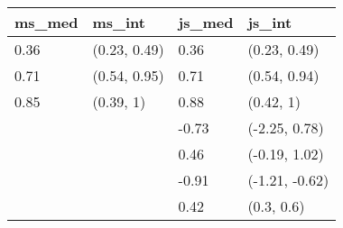 
\begin{tabular}{llll}
\toprule
ms\_med & ms\_int & js\_med & js\_int\\
\midrule
0.36 & (0.23, 0.49) & 0.36 & (0.23, 0.49)\\
0.71 & (0.54, 0.95) & 0.71 & (0.54, 0.94)\\
0.85 & (0.39, 1) & 0.88 & (0.42, 1)\\
 &  & -0.73 & (-2.25, 0.78)\\
 &  & 0.46 & (-0.19, 1.02)\\
 &  & -0.91 & (-1.21, -0.62)\\
 &  & 0.42 & (0.3, 0.6)\\
\bottomrule
\end{tabular}
